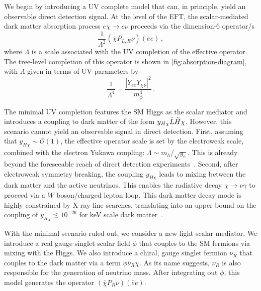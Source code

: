 \documentclass[aps, prd, reprint, nofootinbib, amsmath, amssymb, floatfix]{revtex4-2}
\begin{document}
We begin by introducing a UV complete model that can, in principle, yield an observable direct detection signal. At the level of the EFT, the scalar-mediated dark matter absorption process $e\chi \to e \nu$ proceeds via the dimension-6 operator/s
%
\begin{equation}
    \frac{1}{\Lambda^2}(\bar{\chi}P_{L,R}\nu)(\bar{e}e) \,,
\end{equation}
%
where $\Lambda$ is a scale associated with the UV completion of the effective operator. The tree-level completion of this operator is shown in \cref{fig:absorption-diagram}, with $\Lambda$ given in terms of UV parameters by
%
\begin{equation}
    \frac{1}{\Lambda^4} = \frac{\left|Y_{ee}Y_{\chi \nu}\right|^2}{m_\phi^4} \,.
\end{equation}

The minimal UV completion features the SM Higgs as the scalar mediator and introduces a coupling to dark matter of the form $y_{H\chi} \bar{L} \Tilde{H} \chi$. However, this scenario cannot yield an observable signal in direct detection. First, assuming that $y_{H\chi}\sim\mathcal{O}(1)$, the effective operator scale is set by the electroweak scale, combined with the electron Yukawa coupling: $\Lambda\sim m_h/\sqrt{y_e}$. This is already beyond the foreseeable reach of direct detection experiments~\cite{Dror:2020czw}. Second, after electroweak symmetry breaking, the coupling $y_{H\chi}$ leads to mixing between the dark matter and the active neutrinos. This enables the radiative decay $\chi\to\nu\gamma$ to proceed via a $W$ boson/charged lepton loop. This dark matter decay mode is highly constrained by X-ray line searches, translating into an upper bound on the coupling of $y_{H\chi} \lesssim 10^{-26}$ for keV scale dark matter~\cite{Ng:2019gch}.

With the minimal scenario ruled out, we consider a new light scalar mediator. We introduce a real gauge singlet scalar field $\phi$ that couples to the SM fermions via mixing with the Higgs. We also introduce a chiral, gauge singlet fermion $\nu_R$ that couples to the dark matter via a term $\phi\bar{\nu}_R\chi$. As its name suggests, $\nu_R$ is also responsible for the generation of neutrino mass. After integrating out $\phi$, this model generates the operator $(\bar{\chi}P_R\nu)(\bar{e}e)$.
\end{document}
